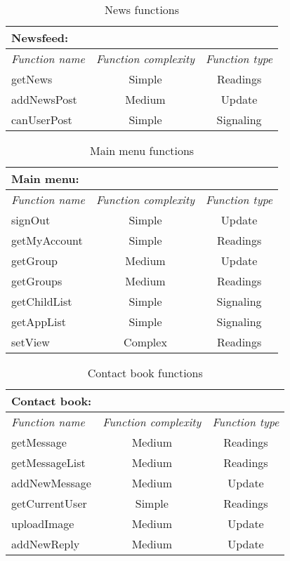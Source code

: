 \begin{table}[!ht]
\centering
\begin{tabular}{ l  c  c }

Newsfeed: & & \\ \hline
\textit{Function name} & \textit{Function complexity} & \textit{Function type} \\ \hline
getNews & Simple & Readings \\ \hline
addNewsPost & Medium & Update \\ \hline
canUserPost & Simple & Signaling \\ \hline

\end{tabular}
\caption{News functions}
\label{tbl:newsfeed}
\end{table}

\begin{table}[!ht]
\centering
\begin{tabular}{ l  c  c }

Main menu: & & \\ \hline
\textit{Function name} & \textit{Function complexity} & \textit{Function type} \\ \hline
signOut & Simple & Update \\ \hline
getMyAccount & Simple & Readings \\ \hline
getGroup & Medium & Update \\ \hline
getGroups & Medium & Readings \\ \hline
getChildList & Simple & Signaling \\ \hline
getAppList & Simple & Signaling \\ \hline
setView & Complex & Readings \\ \hline

\end{tabular}
\caption{Main menu functions}
\label{tbl:mainmenu}
\end{table}

\begin{table}[!ht]
\centering
\begin{tabular}{ l  c  c }

Contact book: & & \\ \hline
\textit{Function name} & \textit{Function complexity} & \textit{Function type} \\ \hline
getMessage & Medium & Readings \\ \hline
getMessageList & Medium & Readings \\ \hline
addNewMessage & Medium & Update \\ \hline
getCurrentUser & Simple & Readings \\ \hline
uploadImage & Medium & Update \\ \hline
addNewReply & Medium & Update \\ \hline

\end{tabular}
\caption{Contact book functions}
\label{tbl:contactbook}
\end{table}
